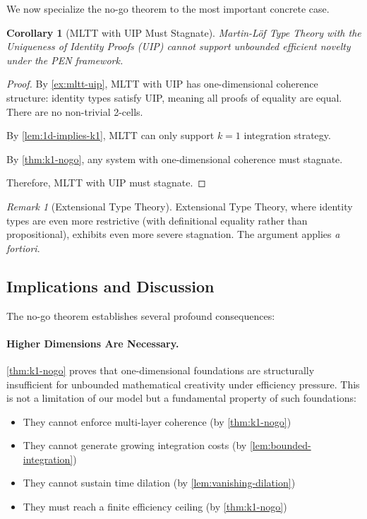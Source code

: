 \documentclass[11pt]{article}
\newtheorem{corollary}[theorem]{Corollary}
\theoremstyle{definition}
\theoremstyle{remark}
\newtheorem{remark}[theorem]{Remark}
\begin{document}
We now specialize the no-go theorem to the most important concrete case.

\begin{corollary}[MLTT with UIP Must Stagnate]
\label{cor:mltt-stagnates}
Martin-Löf Type Theory with the Uniqueness of Identity Proofs (UIP) cannot support unbounded efficient novelty under the PEN framework.
\end{corollary}

\begin{proof}
By \cref{ex:mltt-uip}, MLTT with UIP has one-dimensional coherence structure: identity types satisfy UIP, meaning all proofs of equality are equal. There are no non-trivial 2-cells.

By \cref{lem:1d-implies-k1}, MLTT can only support $k = 1$ integration strategy.

By \cref{thm:k1-nogo}, any system with one-dimensional coherence must stagnate.

Therefore, MLTT with UIP must stagnate.
\end{proof}

\begin{remark}[Extensional Type Theory]
\label{rem:extensional-tt}
Extensional Type Theory, where identity types are even more restrictive (with definitional equality rather than propositional), exhibits even more severe stagnation. The argument applies \emph{a fortiori}.
\end{remark}

\subsection{Implications and Discussion}

The no-go theorem establishes several profound consequences:

\paragraph{Higher Dimensions Are Necessary.}

\cref{thm:k1-nogo} proves that one-dimensional foundations are structurally insufficient for unbounded mathematical creativity under efficiency pressure. This is not a limitation of our model but a fundamental property of such foundations:
\begin{itemize}
\item They cannot enforce multi-layer coherence (by \cref{thm:k1-nogo})
\item They cannot generate growing integration costs (by \cref{lem:bounded-integration})
\item They cannot sustain time dilation (by \cref{lem:vanishing-dilation})
\item They must reach a finite efficiency ceiling (by \cref{thm:k1-nogo})
\end{itemize}
\end{document}
